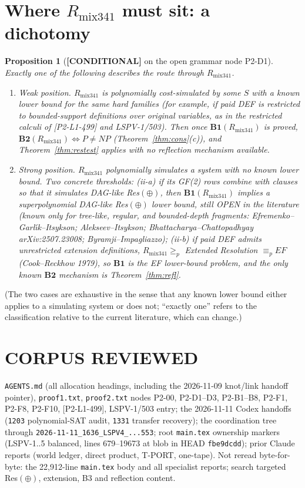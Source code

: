 \documentclass[11pt]{article}
\newtheorem{proposition}[theorem]{Proposition}
\theoremstyle{remark}
\newcommand{\status}[1]{\textbf{[#1]}}
\begin{document}
\section{Where $R_{\mathrm{mix341}}$ must sit: a dichotomy}
\begin{proposition}[\status{CONDITIONAL} on the open grammar node P2-D1]\label{prop:dich}
Exactly one of the following describes the route through $R_{\mathrm{mix341}}$.
\begin{enumerate}
\item[(i)] \emph{Weak position.} $R_{\mathrm{mix341}}$ is polynomially cost-simulated by some $S$
with a known lower bound for the same hard families (for example, if paid DEF is restricted
to bounded-support definitions over original variables, as in the restricted calculi of
[P2-L1-499] and LSPV-1/503). Then once $\mathbf{B1}(R_{\mathrm{mix341}})$ is proved,
$\mathbf{B2}(R_{\mathrm{mix341}})\iff P\ne NP$ (Theorem~\ref{thm:cons}(c)), and
Theorem~\ref{thm:restest} applies with no reflection mechanism available.
\item[(ii)] \emph{Strong position.} $R_{\mathrm{mix341}}$ polynomially simulates a system with no known
lower bound. Two concrete thresholds: (ii-a) if its GF(2) rows combine with clauses so that it
simulates DAG-like Res$(\oplus)$, then $\mathbf{B1}(R_{\mathrm{mix341}})$ implies a superpolynomial
DAG-like Res$(\oplus)$ lower bound, still OPEN in the literature (known only for tree-like, regular,
and bounded-depth fragments: Efremenko--Garl\'{\i}k--Itsykson; Alekseev--Itsykson;
Bhattacharya--Chattopadhyay arXiv:2507.23008; Byramji--Impagliazzo); (ii-b) if paid DEF admits
unrestricted extension definitions, $R_{\mathrm{mix341}}\ge_p$ Extended Resolution $\equiv_p EF$
(Cook--Reckhow 1979), so $\mathbf{B1}$ is the EF lower-bound problem, and the only known
$\mathbf{B2}$ mechanism is Theorem~\ref{thm:refl}.
\end{enumerate}
\end{proposition}
\noindent(The two cases are exhaustive in the sense that any known lower bound either applies
to a simulating system or does not; ``exactly one'' refers to the classification relative to
the current literature, which can change.)

\section{CORPUS REVIEWED}
\texttt{AGENTS.md} (all allocation headings, including the 2026-11-09 knot/link handoff pointer),
\texttt{proof1.txt}, \texttt{proof2.txt} nodes P2-00, P2-D1--D3, P2-B1--B8, P2-F1, P2-F8, P2-F10,
[P2-L1-499], LSPV-1/503 entry; the 2026-11-11 Codex handoffs (\texttt{1203} polynomial-SAT audit,
\texttt{1331} transfer recovery); the coordination tree through
\texttt{2026-11-11\_1636\_LSPV4\_...553}; root \texttt{main.tex} ownership markers (LSPV-1..5
balanced, lines 679--19673 at blob in HEAD \texttt{fbe9dcdd}); prior Claude reports
(world ledger, direct product, T-PORT, one-tape). Not reread byte-for-byte: the 22{,}912-line
\texttt{main.tex} body and all specialist reports; search targeted Res$(\oplus)$, extension, B3
and reflection content.
\end{document}
